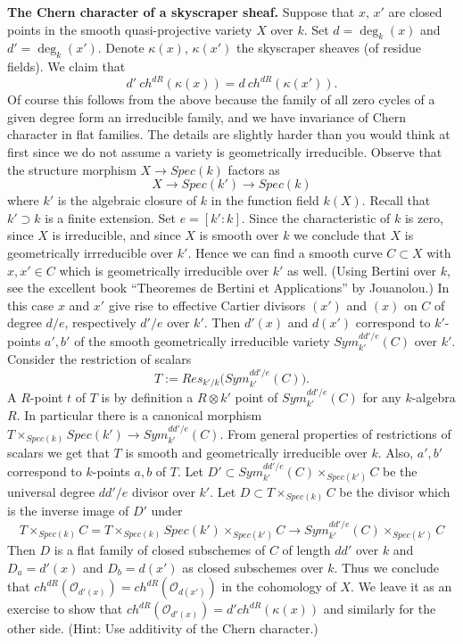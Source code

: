 \medskip\noindent
{\bf The Chern character of a skyscraper sheaf.} 
Suppose that $x$, $x'$ are closed points in the smooth
quasi-projective variety $X$ over $k$. Set $d =\deg_k(x)$
and $d' = \deg_k(x')$. Denote $\kappa(x)$, $\kappa(x')$
the skyscraper sheaves (of residue fields). We claim that
$$
d'\ ch^{dR}( \kappa(x) ) = d\ ch^{dR}( \kappa(x') ).
$$
Of course this follows from the above because the family
of all zero cycles of a given degree form an irreducible
family, and we have invariance of Chern character in flat
families. The details are slightly harder than you would
think at first since we do not assume a variety is
geometrically irreducible. Observe that the structure
morphism $X \to Spec(k)$ factors as
$$
X \longrightarrow Spec( k' ) \longrightarrow Spec(k)
$$
where $k'$ is the algebraic closure of $k$ in the function
field $k(X)$. Recall that $k' \supset k$ is a finite extension.
Set $e=[k':k]$. Since the characteristic of $k$ is zero, since
$X$ is irreducible, and since $X$ is smooth over $k$ we conclude
that $X$ is geometrically irrreducible over $k'$. Hence we
can find a smooth curve $C \subset X$ with $x, x' \in C$ which
is geometrically irreducible over $k'$ as well. (Using Bertini
over $k$, see the excellent book ``Theoremes de Bertini et
Applications'' by Jouanolou.) In this case $x$ and $x'$ give
rise to effective Cartier divisors $(x')$ and $(x)$ on $C$
of degree $d/e$, respectively $d'/e$ over $k'$. Then $d'(x)$ and $d(x')$
correspond to $k'$-points $a', b'$ of the smooth geometrically irreducible
variety $Sym^{dd'/e}_{k'}(C)$ over $k'$. Consider the restriction
of scalars
$$
T := Res_{k'/k}\Big(Sym^{dd'/e}_{k'}(C)\Big).
$$
A $R$-point $t$ of $T$ is by definition a $R\otimes k'$ point
of $Sym^{dd'/e}_{k'}(C)$ for any $k$-algebra $R$. In particular
there is a canonical morphism $T \times_{Spec(k)} Spec(k') \to 
Sym^{dd'/e}_{k'}(C)$. From general properties of restrictions
of scalars we get that $T$ is smooth and geometrically irreducible
over $k$. Also, $a', b'$ correspond to $k$-points $a,b$ of $T$.
Let $D' \subset Sym^{dd'/e}_{k'}(C) \times_{Spec(k')} C$ be the
universal degree $dd'/e$ divisor over $k'$. Let
$D \subset T \times_{Spec(k)} C$ be the divisor which is the inverse
image of $D'$ under
$$
T \times_{Spec(k)} C
=
T \times_{Spec(k)} Spec(k') \times_{Spec(k')} C
\longrightarrow
Sym^{dd'/e}_{k'}(C) \times_{Spec(k')} C
$$
Then $D$ is a flat family of closed subschemes of $C$ of length
$dd'$ over $k$ and $D_a = d'(x)$ and $D_b = d(x')$ as closed
subschemes over $k$. Thus we conclude that
$ch^{dR}({\mathcal O}_{d'(x)}) = ch^{dR}({\mathcal O}_{d(x')})$ in the
cohomology of $X$. We leave it as an exercise to show that
$ch^{dR}({\mathcal O}_{d'(x)}) = d' ch^{dR}( \kappa(x) )$
and similarly for the other side. (Hint: Use additivity of
the Chern character.)

